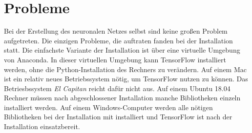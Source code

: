 \section{Probleme}
\label{sec:probleme}
\printsubchapterauthor{\authorNiklas}
Bei der Erstellung des neuronalen Netzes selbst sind keine großen Problem aufgetreten. Die einzigen Probleme, die auftraten fanden bei der Installation statt. Die einfachste Variante der Installation ist über eine virtuelle Umgebung von Anaconda. In dieser virtuellen Umgebung kann TensorFlow installiert werden, ohne die Python-Installation des Rechners zu verändern. Auf einem Mac ist ein relativ neues Betriebssystem nötig, um TensorFlow nutzen zu können. Das Betriesbssystem \textit{El Capitan} reicht dafür nicht aus. Auf einem Ubuntu 18.04 Rechner müssen nach abgeschlossener Installation manche Bibliotheken einzeln installiert werden. Auf einem Windows-Computer werden alle nötigen Bibliotheken bei der Installation mit installiert und TensorFlow ist nach der Installation einsatzbereit.